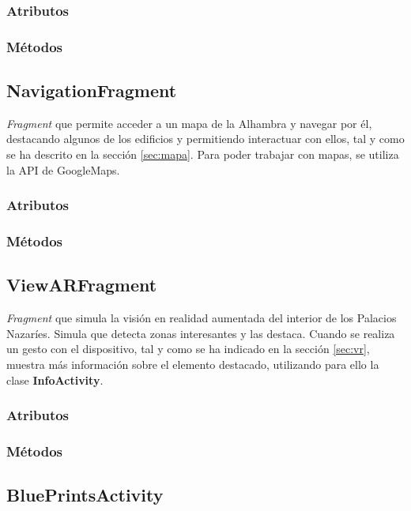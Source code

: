 \documentclass[11pt,a4paper]{article}
\begin{document}
\subsubsection{Atributos}

\subsubsection{Métodos}

\subsection{\textbf{NavigationFragment}}
\label{sec:nav}

\textit{Fragment} que permite acceder a un mapa de la Alhambra y navegar por él, destacando
algunos de los edificios y permitiendo interactuar con ellos, tal y como se ha descrito en la sección \ref{sec:mapa}.
Para poder trabajar con mapas, se utiliza la API de GoogleMaps.

\subsubsection{Atributos}

\subsubsection{Métodos}

\subsection{\textbf{ViewARFragment}}
\label{sec:view}

\textit{Fragment} que simula la visión en realidad aumentada del interior de los Palacios
Nazaríes. Simula que detecta zonas interesantes y las destaca. Cuando se realiza un gesto con el dispositivo, tal y como se
ha indicado en la sección \ref{sec:vr}, muestra más información sobre el elemento destacado, utilizando para ello la clase
\textbf{InfoActivity}.

\subsubsection{Atributos}

\subsubsection{Métodos}

\subsection{\textbf{BluePrintsActivity}}
\label{sec:blue}
\end{document}
